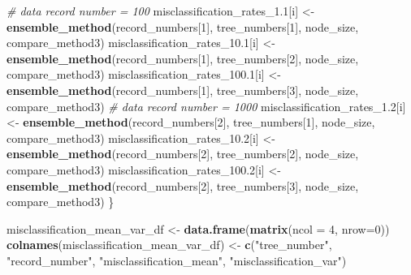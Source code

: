 \documentclass[
]{article}
\newenvironment{Shaded}{\begin{snugshade}}{\end{snugshade}}
\newcommand{\AttributeTok}[1]{\textcolor[rgb]{0.13,0.29,0.53}{#1}}
\newcommand{\CommentTok}[1]{\textcolor[rgb]{0.56,0.35,0.01}{\textit{#1}}}
\newcommand{\DecValTok}[1]{\textcolor[rgb]{0.00,0.00,0.81}{#1}}
\newcommand{\FloatTok}[1]{\textcolor[rgb]{0.00,0.00,0.81}{#1}}
\newcommand{\FunctionTok}[1]{\textcolor[rgb]{0.13,0.29,0.53}{\textbf{#1}}}
\newcommand{\NormalTok}[1]{#1}
\newcommand{\OtherTok}[1]{\textcolor[rgb]{0.56,0.35,0.01}{#1}}
\newcommand{\StringTok}[1]{\textcolor[rgb]{0.31,0.60,0.02}{#1}}
\begin{document}
\begin{Shaded}
\begin{Highlighting}[]
  \CommentTok{\# data record number = 100}
\NormalTok{  misclassification\_rates\_1}\FloatTok{.1}\NormalTok{[i] }\OtherTok{\textless{}{-}} \FunctionTok{ensemble\_method}\NormalTok{(record\_numbers[}\DecValTok{1}\NormalTok{], }
\NormalTok{                                                 tree\_numbers[}\DecValTok{1}\NormalTok{], node\_size, }
\NormalTok{                                                 compare\_method3)}
\NormalTok{  misclassification\_rates\_10}\FloatTok{.1}\NormalTok{[i] }\OtherTok{\textless{}{-}} \FunctionTok{ensemble\_method}\NormalTok{(record\_numbers[}\DecValTok{1}\NormalTok{], }
\NormalTok{                                                  tree\_numbers[}\DecValTok{2}\NormalTok{], node\_size, }
\NormalTok{                                                  compare\_method3)}
\NormalTok{  misclassification\_rates\_100}\FloatTok{.1}\NormalTok{[i] }\OtherTok{\textless{}{-}} \FunctionTok{ensemble\_method}\NormalTok{(record\_numbers[}\DecValTok{1}\NormalTok{], }
\NormalTok{                                                   tree\_numbers[}\DecValTok{3}\NormalTok{], node\_size, }
\NormalTok{                                                compare\_method3)}
  \CommentTok{\# data record number = 1000}
\NormalTok{  misclassification\_rates\_1}\FloatTok{.2}\NormalTok{[i] }\OtherTok{\textless{}{-}} \FunctionTok{ensemble\_method}\NormalTok{(record\_numbers[}\DecValTok{2}\NormalTok{], }
\NormalTok{                                                 tree\_numbers[}\DecValTok{1}\NormalTok{], node\_size, }
\NormalTok{                                                 compare\_method3)}
\NormalTok{  misclassification\_rates\_10}\FloatTok{.2}\NormalTok{[i] }\OtherTok{\textless{}{-}} \FunctionTok{ensemble\_method}\NormalTok{(record\_numbers[}\DecValTok{2}\NormalTok{], }
\NormalTok{                                                  tree\_numbers[}\DecValTok{2}\NormalTok{], node\_size, }
\NormalTok{                                                  compare\_method3)}
\NormalTok{  misclassification\_rates\_100}\FloatTok{.2}\NormalTok{[i] }\OtherTok{\textless{}{-}} \FunctionTok{ensemble\_method}\NormalTok{(record\_numbers[}\DecValTok{2}\NormalTok{], }
\NormalTok{                                                   tree\_numbers[}\DecValTok{3}\NormalTok{], node\_size, }
\NormalTok{                                                compare\_method3)}
\NormalTok{\}}

\NormalTok{misclassification\_mean\_var\_df }\OtherTok{\textless{}{-}} \FunctionTok{data.frame}\NormalTok{(}\FunctionTok{matrix}\NormalTok{(}\AttributeTok{ncol =} \DecValTok{4}\NormalTok{, }\AttributeTok{nrow=}\DecValTok{0}\NormalTok{))}
\FunctionTok{colnames}\NormalTok{(misclassification\_mean\_var\_df) }\OtherTok{\textless{}{-}} \FunctionTok{c}\NormalTok{(}\StringTok{"tree\_number"}\NormalTok{, }\StringTok{"record\_number"}\NormalTok{, }\StringTok{"misclassification\_mean"}\NormalTok{, }\StringTok{"misclassification\_var"}\NormalTok{) }


\end{Highlighting}
\end{Shaded}
\end{document}
